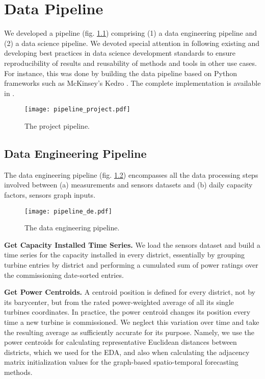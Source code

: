 \graphicspath{{./figures/pipeline/}}

\chapter{Data Pipeline}
We developed a pipeline (fig. \ref{fig:project_pipeline}) comprising (1) a data engineering pipeline and (2) a data science pipeline.
We devoted special attention in following existing and developing best practices in data science development standards to ensure reproducibility of results and reusability of methods and tools in other use cases.
For instance, this was done by building the data pipeline based on Python frameworks such as McKinsey's Kedro \cite{kedro}.
The complete implementation is available in \cite{windstfgithub}.

\begin{figure}[H]
   \centering
    \caption{The project pipeline.}
    \texttt{[image: pipeline\_project.pdf]}
   \label{fig:project_pipeline}
\end{figure}


\section{Data Engineering Pipeline}
The data engineering pipeline (fig. \ref{fig:pipeline_de}) encompasses all the data processing steps involved between (a) measurements and sensors datasets and (b) daily capacity factors, sensors graph inputs.

\begin{figure}[H]
   \centering
    \caption{The data engineering pipeline.}
    \texttt{[image: pipeline\_de.pdf]}
   \label{fig:pipeline_de}
\end{figure}

\vspace{1em}
\noindent
\textbf{Get Capacity Installed Time Series.}  We load the sensors dataset and build a time series for the capacity installed in every district, essentially by grouping turbine entries by district and performing a cumulated sum of power ratings over the commissioning date-sorted entries.

\vspace{1em}
\noindent
\textbf{Get Power Centroids.}  A centroid position is defined for every district, not by its barycenter, but from the rated power-weighted average of all its single turbines coordinates. In practice, the power centroid changes its position every time a new turbine is commissioned. We neglect this variation over time and take the resulting average as sufficiently accurate for its purpose. Namely, we use the power centroids for calculating representative Euclidean distances between districts, which we used for the EDA, and also when calculating the adjacency matrix initialization values for the graph-based spatio-temporal forecasting methods.

